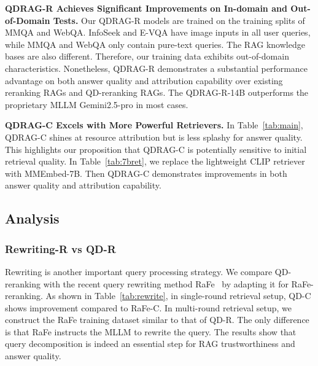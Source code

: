 \documentclass[letterpaper]{article} %
\begin{document}
{\noindent \textbf{QDRAG-R Achieves Significant Improvements on In-domain and Out-of-Domain Tests.}} Our QDRAG-R models are trained on the training splits of MMQA and WebQA. InfoSeek and E-VQA have image inputs in all user queries, while MMQA and WebQA only contain pure-text queries. The RAG knowledge bases are also different. Therefore, our training data exhibits out-of-domain characteristics. Nonetheless, QDRAG-R demonstrates a substantial performance advantage on both answer quality and attribution capability over existing reranking RAGs and QD-reranking RAGs. The QDRAG-R-14B outperforms the proprietary MLLM Gemini2.5-pro in most cases. 

{\noindent \textbf{QDRAG-C Excels with More Powerful Retrievers.}} In Table~\ref{tab:main}, QDRAG-C shines at resource attribution but is less splashy for answer quality. This highlights our proposition that QDRAG-C is potentially sensitive to initial retrieval quality. In Table~\ref{tab:7bret}, we replace the lightweight CLIP retriever with MMEmbed-7B. Then QDRAG-C demonstrates improvements in both answer quality and attribution capability. 

\subsection{Analysis}

\subsubsection{Rewriting-R vs QD-R}

Rewriting is another important query processing strategy. 
We compare QD-reranking with the recent query rewriting method RaFe~\cite{mao-etal-2024-rafe} by adapting it for RaFe-reranking. As shown in Table~\ref{tab:rewrite}, in single-round retrieval setup, QD-C shows improvement compared to RaFe-C. In multi-round retrieval setup, we construct the RaFe training dataset similar to that of QD-R. The only difference is that RaFe instructs the MLLM to rewrite the query. The results show that query decomposition is indeed an essential step for RAG trustworthiness and answer quality. 
\end{document}
